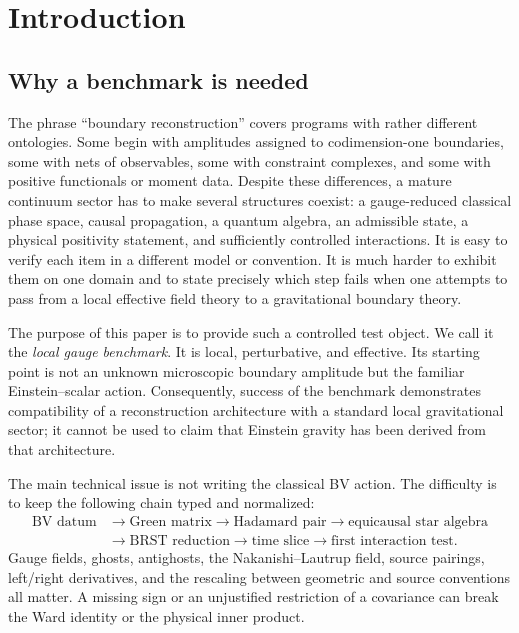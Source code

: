 \documentclass[11pt]{article}
\theoremstyle{definition}
\theoremstyle{remark}
\begin{document}
\tableofcontents

\section{Introduction}

\subsection{Why a benchmark is needed}

The phrase ``boundary reconstruction'' covers programs with rather different
ontologies.  Some begin with amplitudes assigned to codimension-one boundaries, some
with nets of observables, some with constraint complexes, and some with positive
functionals or moment data.  Despite these differences, a mature continuum sector has
to make several structures coexist: a gauge-reduced classical phase space, causal
propagation, a quantum algebra, an admissible state, a physical positivity statement,
and sufficiently controlled interactions.  It is easy to verify each item in a
different model or convention.  It is much harder to exhibit them on one domain and
to state precisely which step fails when one attempts to pass from a local effective
field theory to a gravitational boundary theory.

The purpose of this paper is to provide such a controlled test object.  We call it the
\emph{local gauge benchmark}.  It is local, perturbative, and effective.  Its starting point
is not an unknown microscopic boundary amplitude but the familiar Einstein--scalar
action.  Consequently, success of the benchmark demonstrates compatibility of a
reconstruction architecture with a standard local gravitational sector; it cannot be
used to claim that Einstein gravity has been derived from that architecture.

The main technical issue is not writing the classical BV action.  The difficulty is
to keep the following chain typed and normalized:
\begin{equation}
 \begin{aligned}
 \text{BV datum}&\longrightarrow \text{Green matrix}
 \longrightarrow \text{Hadamard pair}
 \longrightarrow \text{equicausal star algebra}\\
 &\longrightarrow \text{BRST reduction}
 \longrightarrow \text{time slice}
 \longrightarrow \text{first interaction test}.
 \end{aligned}
 \label{eq:chain}
\end{equation}
Gauge fields, ghosts, antighosts, the Nakanishi--Lautrup field, source pairings,
left/right derivatives, and the rescaling between geometric and source conventions all
matter.  A missing sign or an unjustified restriction of a covariance can break the
Ward identity or the physical inner product.
\end{document}
